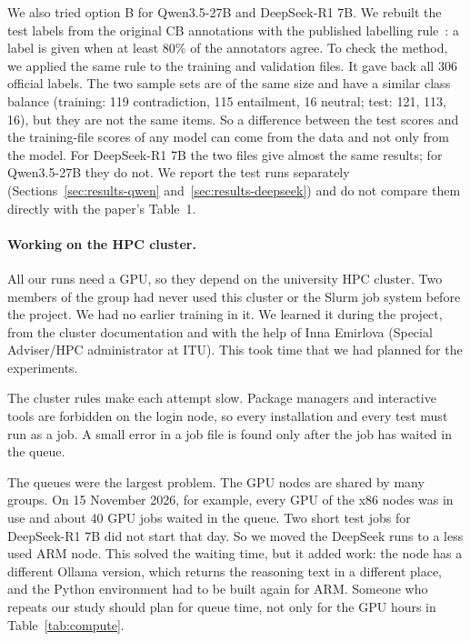 We also tried option B for Qwen3.5-27B and DeepSeek-R1 7B. We rebuilt the test labels from the
original CB annotations with the published labelling rule~\cite{Jiang:2019}:
a label is given when at least 80\% of the annotators agree. To check the
method, we applied the same rule to the training and validation files. It
gave back all 306 official labels. The two sample sets are of the same size
and have a similar class balance (training: 119 contradiction, 115
entailment, 16 neutral; test: 121, 113, 16), but they are not the same items.
So a difference between the test scores and the training-file scores of
any model can come from the data and not only from the model. For
DeepSeek-R1 7B the two files give almost the same results; for Qwen3.5-27B
they do not. We report the test runs separately
(Sections~\ref{sec:results-qwen} and~\ref{sec:results-deepseek}) and do not
compare them directly with the paper's Table~1.

\paragraph{Working on the HPC cluster.}
All our runs need a GPU, so they depend on the university HPC cluster. Two
members of the group had never used this cluster or the Slurm job system
before the project. We had no earlier training in it. We learned it during the
project, from the cluster documentation and with the help of
Inna Emirlova (Special Adviser/HPC administrator at ITU). This
took time that we had planned for the experiments.

The cluster rules make each attempt slow. Package managers and interactive
tools are forbidden on the login node, so every installation and every test
must run as a job. A small error in a job file is found only after the job has
waited in the queue.

The queues were the largest problem. The GPU nodes are shared by many groups.
On 15 November 2026, for example, every GPU of the x86 nodes was in use and
about 40 GPU jobs waited in the queue. Two short test jobs for DeepSeek-R1 7B
did not start that day. So we moved the DeepSeek runs to a less used ARM
node. This solved the waiting time, but it added work: the node has a
different Ollama version, which returns the reasoning text in a different
place, and the Python environment had to be built again for ARM. Someone who
repeats our study should plan for queue time, not only for the GPU hours in
Table~\ref{tab:compute}.

